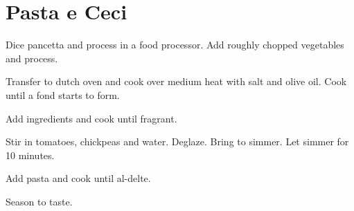 \section{Pasta e Ceci}
\begin{recipe}


Dice pancetta and process in a food processor. Add roughly chopped vegetables
and process.

Transfer to dutch oven and cook over medium heat with salt and olive oil. Cook
until a fond starts to form.


Add ingredients and cook until fragrant.


Stir in tomatoes, chickpeas and water. Deglaze. Bring to simmer. Let simmer for
10 minutes.


Add pasta and cook until al-delte.


Season to taste.

\end{recipe}
